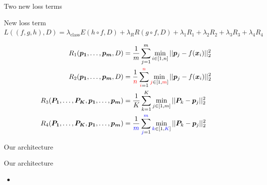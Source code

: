 \documentclass{beamer}[169]
\begin{document}
\begin{frame}{Two new loss terms}
\begin{block}{New loss term}
$L((f,g,h),D) = \lambda_{\text{class}}E(h \circ f, D) + \lambda_R R(g \circ f,D) + \lambda_1 R_1 + \lambda_2 R_2 + \lambda_3 R_3 + \lambda_4 R_4$
\end{block}
 \begin{align*}
R_1(\bm{p_1}, \dots, \bm{p_m}, D) &= \frac{1}{m}\sum_{j=1}^m \min_{i\in [1,n]}||\bm{p}_j- f(\bm{x}_i)||^2_2 \\
      R_2(\bm{p_1},  \dots, \bm{p_m}, D) &= \frac{1}{{\color{red}n}}\sum_{{\color{red}i}=1}^{{\color{red}n}} \min_{{\color{red}j}\in [1,{\color{red}m}]}||\bm{p}_j- f(\bm{x}_i)||^2_2\\
     R_3(\bm{P_1}, \dots, \bm{P_K}, \bm{p_1}, \dots, \bm{p_m}) &= \frac{1}{K}\sum_{k=1}^K \min_{j\in [1,m]}||\bm{P}_k- \bm{p}_j||^2_2 \\
    R_4(\bm{P_1}, \dots, \bm{P_K}, \bm{p_1}, \dots, \bm{p_m}) &= \frac{1}{{\color{blue}m}}\sum_{{\color{blue}j}=1}^{{\color{blue}m}} \min_{{\color{blue}k}\in [1,{\color{blue}K}]}||\bm{P}_k- \bm{p}_j||^2_2
 \end{align*}
\end{frame}

\begin{frame}{Our architecture}
    
\end{frame}

\begin{frame}{Our architecture}
\begin{itemize}
    \item 
\end{itemize}
\end{frame}
\end{document}
